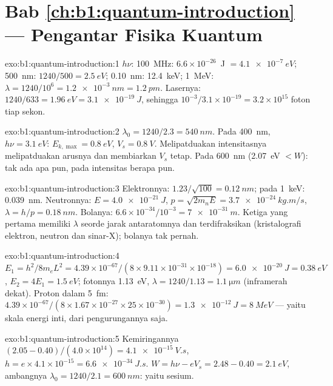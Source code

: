 \section*{Bab \ref{ch:b1:quantum-introduction} --- Pengantar Fisika Kuantum}

\begin{solution}{exo:b1:quantum-introduction:1}
$h\nu$: \qty{100}{MHz}: $6.6 \times 10^{-26}$~J $= \qty{4.1e-7}{eV}$; \qty{500}{nm}:
$1240/500 = \qty{2.5}{eV}$; \qty{0.10}{nm}: \qty{12.4}{keV}; \qty{1}{MeV}: $\lambda =
1240/10^6 = \qty{1.2e-3}{nm} = \qty{1.2}{pm}$. Lasernya: $1240/633 = \qty{1.96}{eV} =
\qty{3.1e-19}{J}$, sehingga $10^{-3}/3.1 \times 10^{-19} = 3.2 \times 10^{15}$ foton tiap
sekon.
\end{solution}

\begin{solution}{exo:b1:quantum-introduction:2}
$\lambda_0 = 1240/2.3 = \qty{540}{nm}$. Pada \qty{400}{nm}, $h\nu = \qty{3.1}{eV}$:
$E_{k,\max} = \qty{0.8}{eV}$, $V_s = \qty{0.8}{V}$. Melipatduakan intensitasnya
melipatduakan arusnya dan membiarkan $V_s$ tetap. Pada \qty{600}{nm}
(\qty{2.07}{eV} $< W$): tak ada apa pun, pada intensitas berapa pun.
\end{solution}

\begin{solution}{exo:b1:quantum-introduction:3}
Elektronnya: $1.23/\sqrt{100} = \qty{0.12}{nm}$; pada \qty{1}{keV}: \qty{0.039}{nm}.
Neutronnya: $E = \qty{4.0e-21}{J}$, $p = \sqrt{2m_nE} = \qty{3.7e-24}{kg.m/s}$,
$\lambda = h/p = \qty{0.18}{nm}$. Bolanya: $6.6 \times 10^{-34}/10^{-3} = \qty{7e-31}{m}$.
Ketiga yang pertama memiliki $\lambda$ seorde jarak antaratomnya dan
terdifraksikan (kristalografi elektron, neutron dan sinar-X); bolanya tak pernah.
\end{solution}

\begin{solution}{exo:b1:quantum-introduction:4}
$E_1 = h^2/8m_eL^2 = 4.39 \times 10^{-67}/(8 \times 9.11 \times 10^{-31} \times 10^{-18}) =
\qty{6.0e-20}{J} = \qty{0.38}{eV}$, $E_2 = 4E_1 = \qty{1.5}{eV}$; fotonnya
\qty{1.13}{eV}, $\lambda = 1240/1.13 = \qty{1.1}{\micro m}$ (inframerah dekat). Proton
dalam \qty{5}{fm}: $4.39 \times 10^{-67}/(8 \times 1.67 \times 10^{-27} \times 25 \times 10^{-30}) =
\qty{1.3e-12}{J} = \qty{8}{MeV}$ --- yaitu skala energi inti, dari
pengurungannya saja.
\end{solution}

\begin{solution}{exo:b1:quantum-introduction:5}
Kemiringannya $(2.05 - 0.40)/(4.0 \times 10^{14}) = \qty{4.1e-15}{V.s}$, $h = e \times 4.1 \times
10^{-15} = \qty{6.6e-34}{J.s}$. $W = h\nu - eV_s = 2.48 - 0.40 = \qty{2.1}{eV}$,
ambangnya $\lambda_0 = 1240/2.1 = \qty{600}{nm}$: yaitu sesium.
\end{solution}

